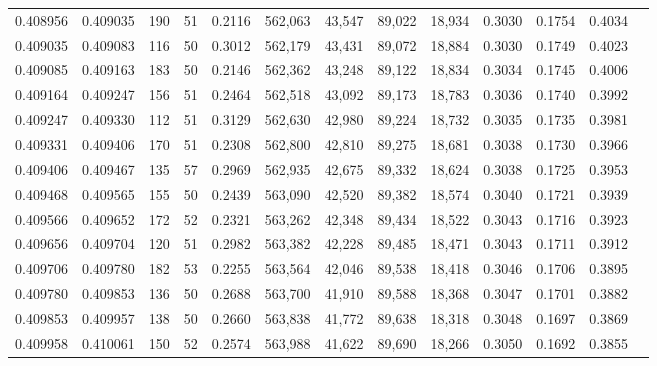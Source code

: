 \begin{tabular}{rrrrrrrrrrrrr}
0.408956 & 0.409035 &   190 &  51 &                                     0.2116 & 562,063 &  43,547 &  89,022 &  18,934 & 0.3030 & 0.1754 & 0.4034 \\
0.409035 & 0.409083 &   116 &  50 &                                     0.3012 & 562,179 &  43,431 &  89,072 &  18,884 & 0.3030 & 0.1749 & 0.4023 \\
0.409085 & 0.409163 &   183 &  50 &                                     0.2146 & 562,362 &  43,248 &  89,122 &  18,834 & 0.3034 & 0.1745 & 0.4006 \\
0.409164 & 0.409247 &   156 &  51 &                                     0.2464 & 562,518 &  43,092 &  89,173 &  18,783 & 0.3036 & 0.1740 & 0.3992 \\
0.409247 & 0.409330 &   112 &  51 &                                     0.3129 & 562,630 &  42,980 &  89,224 &  18,732 & 0.3035 & 0.1735 & 0.3981 \\
0.409331 & 0.409406 &   170 &  51 &                                     0.2308 & 562,800 &  42,810 &  89,275 &  18,681 & 0.3038 & 0.1730 & 0.3966 \\
0.409406 & 0.409467 &   135 &  57 &                                     0.2969 & 562,935 &  42,675 &  89,332 &  18,624 & 0.3038 & 0.1725 & 0.3953 \\
0.409468 & 0.409565 &   155 &  50 &                                     0.2439 & 563,090 &  42,520 &  89,382 &  18,574 & 0.3040 & 0.1721 & 0.3939 \\
0.409566 & 0.409652 &   172 &  52 &                                     0.2321 & 563,262 &  42,348 &  89,434 &  18,522 & 0.3043 & 0.1716 & 0.3923 \\
0.409656 & 0.409704 &   120 &  51 &                                     0.2982 & 563,382 &  42,228 &  89,485 &  18,471 & 0.3043 & 0.1711 & 0.3912 \\
0.409706 & 0.409780 &   182 &  53 &                                     0.2255 & 563,564 &  42,046 &  89,538 &  18,418 & 0.3046 & 0.1706 & 0.3895 \\
0.409780 & 0.409853 &   136 &  50 &                                     0.2688 & 563,700 &  41,910 &  89,588 &  18,368 & 0.3047 & 0.1701 & 0.3882 \\
0.409853 & 0.409957 &   138 &  50 &                                     0.2660 & 563,838 &  41,772 &  89,638 &  18,318 & 0.3048 & 0.1697 & 0.3869 \\
0.409958 & 0.410061 &   150 &  52 &                                     0.2574 & 563,988 &  41,622 &  89,690 &  18,266 & 0.3050 & 0.1692 & 0.3855 \\

\end{tabular}
